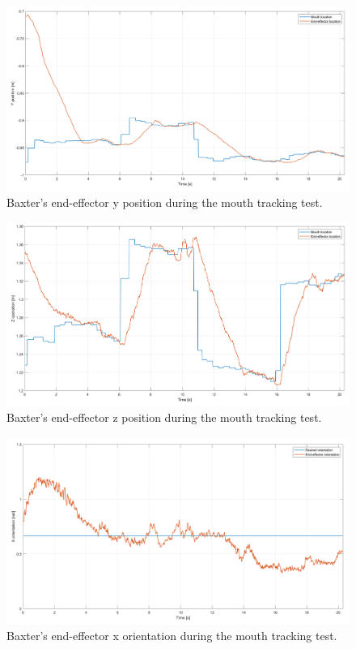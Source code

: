 \documentclass[11pt]{report} %
\begin{document}
\begin{figure}[H]
    \centering
    \includegraphics[width=1.0\linewidth]{assets/imgs/control_theory/mpc_tracking/y_pose.png}
    \caption{Baxter's end-effector y position during the mouth tracking test.} 
    \label{fig_baxter_y_pose_mpc_tracking_experiments}
\end{figure}

\begin{figure}[H]
    \centering
    \includegraphics[width=1.0\linewidth]{assets/imgs/control_theory/mpc_tracking/z_pose.png}
    \caption{Baxter's end-effector z position during the mouth tracking test.} 
    \label{fig_baxter_z_pose_mpc_tracking_experiments}
\end{figure}

\begin{figure}[H]
    \centering
    \includegraphics[width=1.0\linewidth]{assets/imgs/control_theory/mpc_tracking/x_orientation.png}
    \caption{Baxter's end-effector x orientation during the mouth tracking test.} 
    \label{fig_baxter_x_orientation_mpc_tracking_experiments}
\end{figure}
\end{document}
